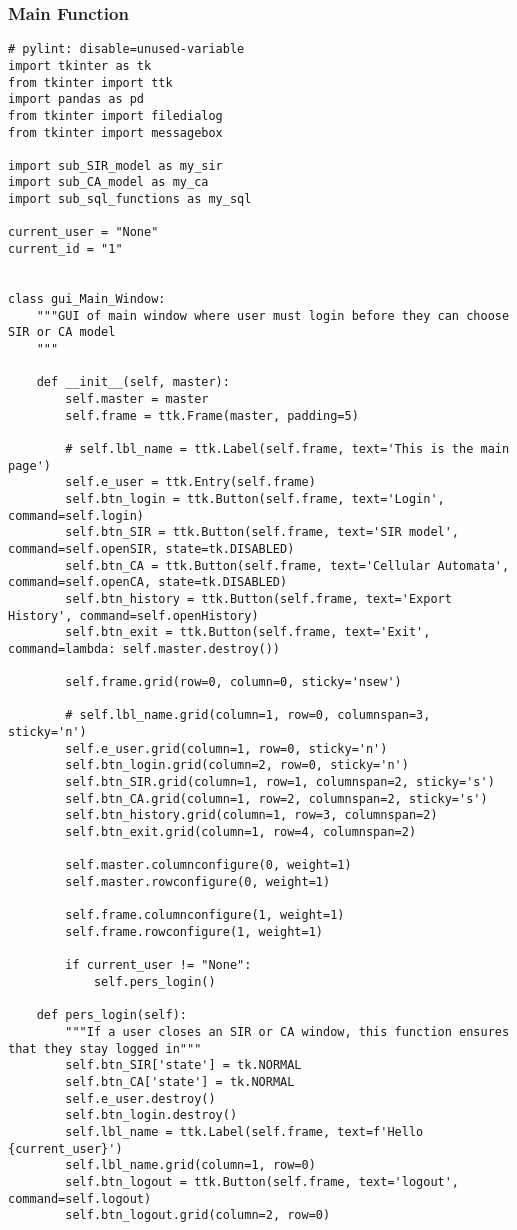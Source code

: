 \documentclass[11pt, a4paper]{article}
\begin{document}
\subsubsection{Main Function}
\begin{lstlisting}
# pylint: disable=unused-variable
import tkinter as tk
from tkinter import ttk
import pandas as pd
from tkinter import filedialog
from tkinter import messagebox

import sub_SIR_model as my_sir
import sub_CA_model as my_ca
import sub_sql_functions as my_sql

current_user = "None"
current_id = "1"


class gui_Main_Window:
    """GUI of main window where user must login before they can choose SIR or CA model
    """

    def __init__(self, master):
        self.master = master
        self.frame = ttk.Frame(master, padding=5)

        # self.lbl_name = ttk.Label(self.frame, text='This is the main page')
        self.e_user = ttk.Entry(self.frame)
        self.btn_login = ttk.Button(self.frame, text='Login', command=self.login)
        self.btn_SIR = ttk.Button(self.frame, text='SIR model', command=self.openSIR, state=tk.DISABLED)
        self.btn_CA = ttk.Button(self.frame, text='Cellular Automata', command=self.openCA, state=tk.DISABLED)
        self.btn_history = ttk.Button(self.frame, text='Export History', command=self.openHistory)
        self.btn_exit = ttk.Button(self.frame, text='Exit', command=lambda: self.master.destroy())

        self.frame.grid(row=0, column=0, sticky='nsew')

        # self.lbl_name.grid(column=1, row=0, columnspan=3, sticky='n')
        self.e_user.grid(column=1, row=0, sticky='n')
        self.btn_login.grid(column=2, row=0, sticky='n')
        self.btn_SIR.grid(column=1, row=1, columnspan=2, sticky='s')
        self.btn_CA.grid(column=1, row=2, columnspan=2, sticky='s')
        self.btn_history.grid(column=1, row=3, columnspan=2)
        self.btn_exit.grid(column=1, row=4, columnspan=2)

        self.master.columnconfigure(0, weight=1)
        self.master.rowconfigure(0, weight=1)

        self.frame.columnconfigure(1, weight=1)
        self.frame.rowconfigure(1, weight=1)

        if current_user != "None":
            self.pers_login()

    def pers_login(self):
        """If a user closes an SIR or CA window, this function ensures that they stay logged in"""
        self.btn_SIR['state'] = tk.NORMAL
        self.btn_CA['state'] = tk.NORMAL
        self.e_user.destroy()
        self.btn_login.destroy()
        self.lbl_name = ttk.Label(self.frame, text=f'Hello {current_user}')
        self.lbl_name.grid(column=1, row=0)
        self.btn_logout = ttk.Button(self.frame, text='logout', command=self.logout)
        self.btn_logout.grid(column=2, row=0)


\end{lstlisting}
\end{document}
